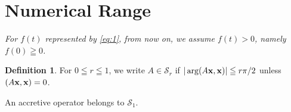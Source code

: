 \documentclass[reqno]{amsart}
\theoremstyle{definition}
\newtheorem{definition}[theorem]{Definition}
\theoremstyle{remark}
\begin{document}
\section{Numerical Range}
\it For $f(t)$ represented by \eqref{eq:1}, 
from now on, we assume $f(t)>0$, namely $f(0)\geqq 0$. 
\rm
\begin{definition}\rm For $0\leqq r \leqq 1$, we write 
$A\in \mathcal{S}_{r}$ if  $|\arg (A {\bf x}, {\bf x}) |\leqq r \pi /2$ unless 
$(A {\bf x}, {\bf x}) = 0$. 
\end{definition}
An accretive operator belongs to $\mathcal{S}_{1}$.
\end{document}
